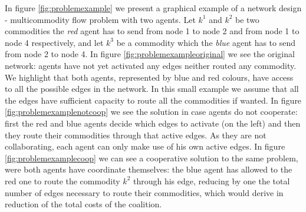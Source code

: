 \documentclass{article}
\begin{document}
In figure \ref{fig:problemexample} we present a graphical example of a network design - multicommodity flow problem with two agents. Let $k^1$ and $k^2$ be two commodities the \emph{red} agent has to send from node 1 to node 2 and from node 1 to node 4 respectively, and let $k^3$ be a commodity which the \emph{blue} agent has to send from node 2 to node 4. In figure \ref{fig:problemexampleoriginal} we see the original network: agents have not yet activated any edges neither routed any commodity. We highlight that both agents, represented by blue and red colours, have access to all the possible edges in the network. In this small example we assume that all the edges have sufficient capacity to route all the commodities if wanted. In figure \ref{fig:problemexamplenotcoop} we see the solution in case agents do not cooperate: first the red and blue agents decide which edges to activate (on the left) and then they route their commodities through that active edges. As they are not collaborating, each agent can only make use of his own active edges. In figure \ref{fig:problemexamplecoop} we can see a cooperative solution to the same problem, were both agents have coordinate themselves: the blue agent has allowed to the red one to route the commodity $k^2$ through his edge, reducing by one the total number of edges necessary to route their commodities, which would derive in reduction of the total costs of the coalition.
\end{document}
